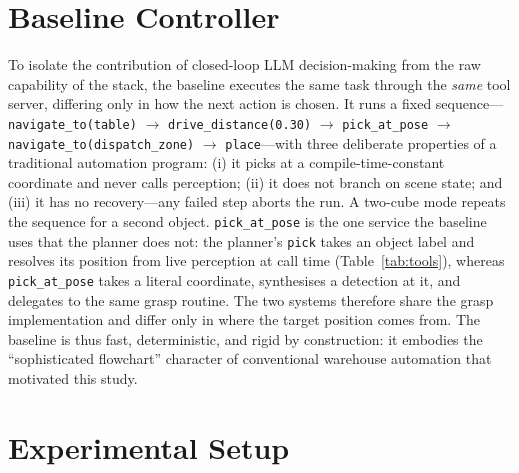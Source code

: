 \documentclass[conference]{IEEEtran}
\begin{document}
\section{Baseline Controller}
\label{sec:baseline}

To isolate the contribution of closed-loop LLM decision-making from the
raw capability of the stack, the baseline executes the same task through
the \emph{same} tool server, differing only in how the next action is
chosen. It runs a fixed sequence---\texttt{navigate\_to(table)}
$\rightarrow$ \texttt{drive\_distance(0.30)} $\rightarrow$
\texttt{pick\_at\_pose} $\rightarrow$
\texttt{navigate\_to(dispatch\_zone)} $\rightarrow$
\texttt{place}---with three deliberate properties of a traditional
automation program: (i) it picks at a compile-time-constant coordinate and
never calls perception; (ii) it does not branch on scene state; and
(iii) it has no recovery---any failed step aborts the run. A two-cube mode
repeats the sequence for a second object. \texttt{pick\_at\_pose} is the one
service the baseline uses that the planner does not: the planner's
\texttt{pick} takes an object label and resolves its position from live
perception at call time (Table~\ref{tab:tools}), whereas
\texttt{pick\_at\_pose} takes a literal coordinate, synthesises a detection
at it, and delegates to the same grasp routine. The two systems therefore
share the grasp implementation and differ only in where the target position
comes from. The baseline is thus fast,
deterministic, and rigid by construction: it embodies the ``sophisticated
flowchart'' character of conventional warehouse automation that motivated
this study.

\section{Experimental Setup}
\label{sec:setup}
\end{document}
